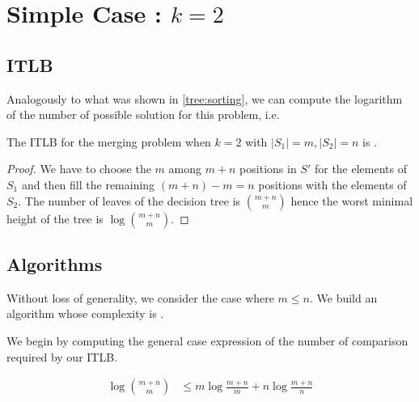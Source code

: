 \section{Simple Case : $k=2$}
\label{tree:merging:k=2}

\subsection{ITLB}
\label{tree:merging:k=2:ITLB}

Analogously to what was shown in \ref{tree:sorting}, we can compute the logarithm of the number of possible solution for this problem, i.e.

\begin{theorem}
The ITLB for the merging problem when $k = 2$ with $|S_1| = m, |S_2| = n$ is .
\end{theorem}

\begin{proof}
We have to choose the $m$ among $m+n$ positions in $S'$ for the elements of $S_1$ and then fill the remaining $(m+n) - m = n$ positions with the elements of $S_2$. The number of leaves of the decision tree is $\binom{m+n}{m}$ hence the worst minimal height of the tree is $\log \binom{m+n}{m}$.
\end{proof}



\subsection{Algorithms}
\label{tree:merging:k=2:alg}

Without loss of generality, we consider the case where $m \leq n$. We build an algorithm whose complexity is .


We begin by computing the general case expression of the number of comparison required by our ITLB.


\begin{lemma}
\begin{align*}
\log\binom{m+n}{m} &\leq m \log\frac{m+n}{m} + n \log\frac{m+n}{n}\\
\end{align*}
\end{lemma}

